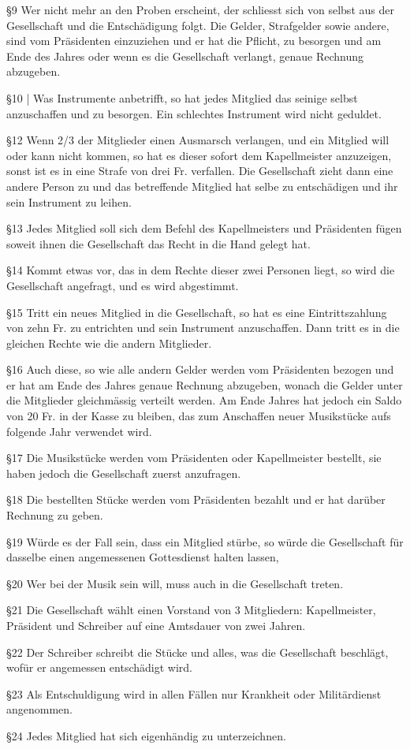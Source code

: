 \begin{history}
    \S9 Wer nicht mehr an den Proben erscheint, der schliesst sich von selbst
    aus der Gesellschaft und die Entschädigung folgt. Die Gelder, Strafgelder
    sowie andere, sind vom Präsidenten einzuziehen und er hat die Pflicht, zu
    besorgen und am Ende des Jahres oder wenn es die Gesellschaft verlangt,
    genaue Rechnung abzugeben.

    \S10 | Was Instrumente anbetrifft, so hat jedes Mitglied das seinige selbst
    anzuschaffen und zu besorgen. Ein schlechtes Instrument wird nicht geduldet.

    \S12 Wenn 2/3 der Mitglieder einen Ausmarsch verlangen, und ein Mitglied
    will oder kann nicht kommen, so hat es dieser sofort dem Kapellmeister
    anzuzeigen, sonst ist es in eine Strafe von drei Fr. verfallen. Die
    Gesellschaft zieht dann eine andere Person zu und das betreffende Mitglied
    hat selbe zu entschädigen und ihr sein Instrument zu leihen.

    \S13 Jedes Mitglied soll sich dem Befehl des Kapellmeisters und Präsidenten
    fügen soweit ihnen die Gesellschaft das Recht in die Hand gelegt hat.

    \S14 Kommt etwas vor, das in dem Rechte dieser zwei Personen liegt, so wird
    die Gesellschaft angefragt, und es wird abgestimmt.

    \S15 Tritt ein neues Mitglied in die Gesellschaft, so hat es eine
    Eintrittszahlung von zehn Fr. zu entrichten und sein Instrument
    anzuschaffen. Dann tritt es in die gleichen Rechte wie die andern
    Mitglieder.

    \S16 Auch diese, so wie alle andern Gelder werden vom Präsidenten bezogen
    und er hat am Ende des Jahres genaue Rechnung abzugeben, wonach die Gelder
    unter die Mitglieder gleichmässig verteilt werden. Am Ende Jahres hat jedoch
    ein Saldo von 20 Fr. in der Kasse zu bleiben, das zum Anschaffen neuer
    Musikstücke aufs folgende Jahr verwendet wird.

    \S17 Die Musikstücke werden vom Präsidenten oder Kapellmeister bestellt, sie
    haben jedoch die Gesellschaft zuerst anzufragen.

    \S18 Die bestellten Stücke werden vom Präsidenten bezahlt und er hat darüber
    Rechnung zu geben.

    \S19 Würde es der Fall sein, dass ein Mitglied stürbe, so würde die
    Gesellschaft für dasselbe einen angemessenen Gottesdienst halten lassen,

    \S20 Wer bei der Musik sein will, muss auch in die Gesellschaft treten.

    \S21 Die Gesellschaft wählt einen Vorstand von 3 Mitgliedern: Kapellmeister,
    Präsident und Schreiber auf eine Amtsdauer von zwei Jahren.

    \S22 Der Schreiber schreibt die Stücke und alles, was die Gesellschaft
    beschlägt, wofür er angemessen entschädigt wird.

    \S23 Als Entschuldigung wird in allen Fällen nur Krankheit oder
    Militärdienst angenommen.

    \S24 Jedes Mitglied hat sich eigenhändig zu unterzeichnen.\\


\end{history}
